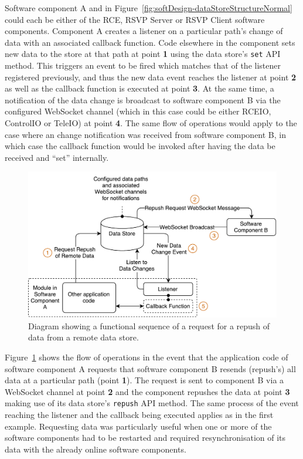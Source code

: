         Software component A and in Figure~\ref{fig:softDesign-dataStoreStructureNormal} could each be either of the RCE, RSVP Server or RSVP Client software components. Component A creates a listener on a particular path's change of data with an associated callback function. Code elsewhere in the component sets new data to the store at that path at point \textbf{1} using the data store's \texttt{set} API method. This triggers an event to be fired which matches that of the listener registered previously, and thus the new data event reaches the listener at point \textbf{2} as well as the callback function is executed at point \textbf{3}. At the same time, a notification of the data change is broadcast to software component B via the configured WebSocket channel (which in this case could be either RCEIO, ControlIO or TeleIO) at point \textbf{4}. The same flow of operations would apply to the case where an change notification was received from software component B, in which case the callback function would be invoked after having the data be received and ``set'' internally.
        
        \begin{figure}[h!]
          \centering
          \includegraphics[width=0.8\linewidth]{figures/softDesign-dataStoreStructureRepushRequest}
          \caption[Diagram showing a functional sequence of a request for a repush of data from a remote data store.]{Diagram showing a functional sequence of a request for a repush of data from a remote data store.}
          \label{fig:softDesign-dataStoreStructureRepushRequest}
        \end{figure}        
        
        Figure~\ref{fig:softDesign-dataStoreStructureRepushRequest} shows the flow of operations in the event that the application code of software component A requests that software component B resends (repush's) all data at a particular path (point \textbf{1}). The request is sent to component B via a WebSocket channel at point \textbf{2} and the component repushes the data at point \textbf{3} making use of its data store's \texttt{repush} API method. The same process of the event reaching the listener and the callback being executed applies as in the first example. Requesting data was particularly useful when one or more of the software components had to be restarted and required resynchronisation of its data with the already online software components.
        

